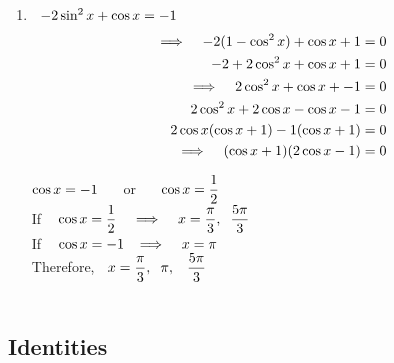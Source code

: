 \documentclass[11pt,a4paper]{article}
\begin{document}
\begin{enumerate}
\item[ii.] $\hspace{0.2cm} -2\sin^2x + \cos x = -1$
\begin{align*}
\implies \hspace{0.3cm} -2(1 - \cos^2x ) + \cos x + 1 & = 0\\
-2 + 2\cos^2x + \cos x +  1 & = 0\\
\implies\hspace{0.3cm} 2\cos^2x + \cos x + - 1 & = 0\\
2\cos^2x + 2\cos x - \cos x - 1 & = 0\\
2\cos x (\cos x + 1) - 1(\cos x + 1) & = 0\\
\implies\hspace{0.3cm} (\cos x + 1)(2\cos x - 1) & = 0
\end{align*}

$\cos x = -1\hspace{0.5cm}$ or $\hspace{0.5cm} \cos x = \dfrac{1}{2}$\\

If $\hspace{0.3cm} \cos x = \dfrac{1}{2}\hspace{0.3cm}\implies\hspace{0.3cm} x = \dfrac{\pi}{3}, \hspace{0.2cm} \dfrac{5\pi}{3}$\\

If $\hspace{0.3cm} \cos x = -1\hspace{0.2cm} \implies\hspace{0.3cm} x = \pi$\\

Therefore, $\hspace{0.2cm}x = \dfrac{\pi}{3}, \hspace{0.2cm} \pi,\hspace{0.3cm} \dfrac{5\pi}{3}$\\\\ 
\end{enumerate}











\subsection{Identities}
\end{document}
